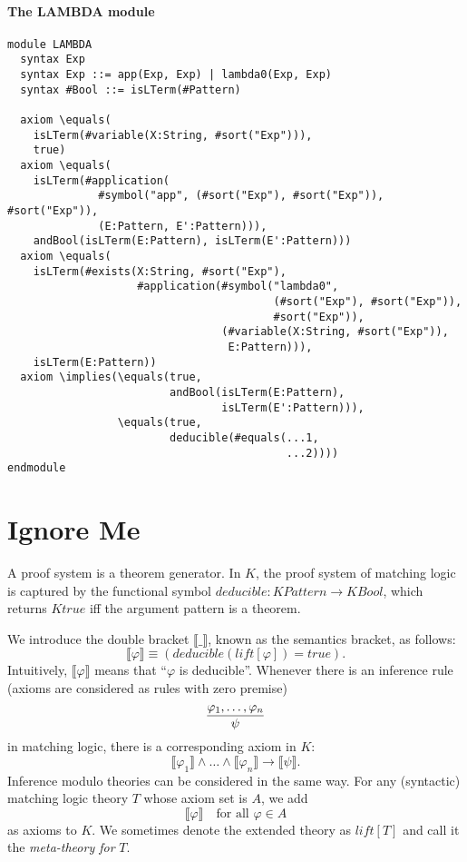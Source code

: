 \documentclass[UTF8]{article}
\theoremstyle{plain}
\theoremstyle{definition}
\theoremstyle{remark}
\newcommand{\Bracket}[1]
    {\llbracket#1\rrbracket}
\newcommand{\KBool}{\mathit{KBool}}
\newcommand{\Ktrue}{\mathit{Ktrue}}
\newcommand{\KPattern}{\mathit{KPattern}}
\begin{document}
\paragraph{The {\small LAMBDA} module}\quad
\begin{Verbatim}[fontsize=\small]
module LAMBDA
  syntax Exp
  syntax Exp ::= app(Exp, Exp) | lambda0(Exp, Exp)
  syntax #Bool ::= isLTerm(#Pattern)

  axiom \equals(
    isLTerm(#variable(X:String, #sort("Exp"))), 
    true)
  axiom \equals(
    isLTerm(#application(
              #symbol("app", (#sort("Exp"), #sort("Exp")), #sort("Exp")),
              (E:Pattern, E':Pattern))),
    andBool(isLTerm(E:Pattern), isLTerm(E':Pattern)))
  axiom \equals(
    isLTerm(#exists(X:String, #sort("Exp"),
                    #application(#symbol("lambda0",
                                         (#sort("Exp"), #sort("Exp")),
                                         #sort("Exp")),
                                 (#variable(X:String, #sort("Exp")),
                                  E:Pattern))),
    isLTerm(E:Pattern))
  axiom \implies(\equals(true, 
                         andBool(isLTerm(E:Pattern), 
                                 isLTerm(E':Pattern))),
                 \equals(true,
                         deducible(#equals(...1,
                                           ...2)))) 
endmodule
\end{Verbatim}

\section{Ignore Me}
A proof system is a theorem generator. 
In $K$, the proof system of matching logic is captured by the functional symbol 
$\mathit{deducible} \colon \KPattern \to \KBool$, which returns $\Ktrue$ 
iff the argument pattern is a theorem. 

We introduce the double bracket $\Bracket{\_}$, known as the semantics bracket, as follows:
\begin{equation*}
\Bracket{\varphi} \equiv 
\left(\textit{deducible}\left(\mathit{lift}[\varphi]\right) = true\right).
\end{equation*}
Intuitively, $\Bracket{\varphi}$ means that ``$\varphi$ is deducible''.
Whenever there is an inference rule (axioms are considered as rules with zero 
premise)
$$
\infer{\psi}
{\varphi_1,\dots,\varphi_n}
$$
in matching logic, there is a corresponding axiom in $K$:
$$
\Bracket{\varphi_1} \wedge \dots \wedge \Bracket{\varphi_n} \to \Bracket{\psi}.
$$
Inference modulo theories can be considered in the same way. 
For any (syntactic) matching logic theory $T$ whose axiom set is $A$, we add
$$
\Bracket{\varphi} \quad \text{for all $\varphi \in A$}
$$
as axioms to $K$. We sometimes denote the extended theory as $\mathit{lift}[T]$ 
and call it 
the \emph{meta-theory for} $T$.
\end{document}
